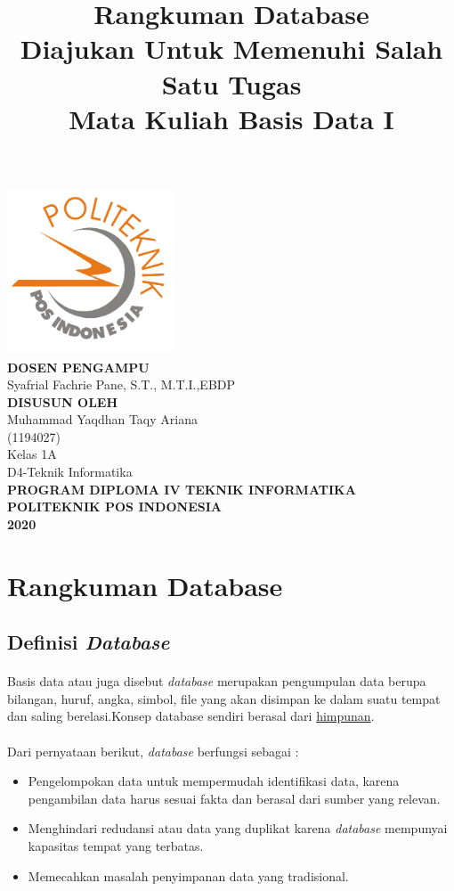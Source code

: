 \documentclass[a4paper,12pt]{article}
\title{\Large{\textbf{Rangkuman Database}}\\Diajukan Untuk Memenuhi Salah Satu Tugas \\Mata Kuliah Basis Data I}
\author{}
\date{}
\begin{document}
\maketitle
\thispagestyle{empty}
\begin{center}
\includegraphics[width=5cm,height=5cm]{logo.png}\\
\hfill\break
\textbf{DOSEN PENGAMPU}\\
Syafrial Fachrie Pane, S.T., M.T.I.,EBDP\\
\hfill\break
\textbf{DISUSUN OLEH}\\
Muhammad Yaqdhan Taqy Ariana\\(1194027)\\Kelas 1A \\D4-Teknik Informatika\\ 
\vfill
\textbf{PROGRAM DIPLOMA IV TEKNIK INFORMATIKA}\\
\textbf{POLITEKNIK POS INDONESIA}\\
\textbf{2020}\\
\end{center}
\newpage
\setcounter{page}{1}
\section{Rangkuman Database}
	\subsection{Definisi \textit{Database}}
		\paragraph{} Basis data atau juga disebut \textit{database} merupakan pengumpulan data berupa bilangan, huruf, angka, simbol, file yang akan disimpan ke dalam suatu tempat dan saling berelasi.Konsep database sendiri berasal dari \underline{himpunan}.
		\paragraph{}Dari pernyataan berikut, \textit{database} berfungsi sebagai :\\
		\begin{itemize}
		\item Pengelompokan data untuk mempermudah identifikasi data, karena pengambilan data harus sesuai fakta dan berasal dari sumber yang relevan.
		\item Menghindari redudansi atau data yang duplikat karena \textit{database} mempunyai kapasitas tempat yang terbatas.
		\item Memecahkan masalah penyimpanan data yang tradisional.
		\end{itemize}
\end{document}
